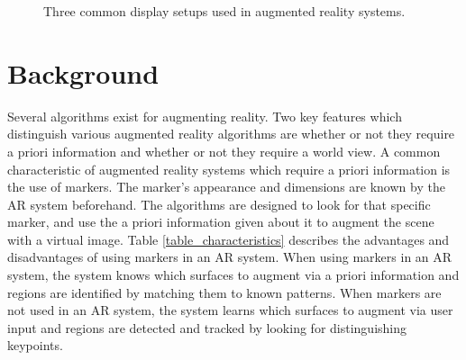 \documentclass[oneside,11pt]{Latex/Classes/PhDthesisPSnPDF}
\begin{document}
\begin{figure}[h!]
  \centering
  \quad{}\quad{}
  \caption{\label{fig_ar_displays} Three common display setups used in augmented reality systems.} 
\end{figure}

\chapter{Background}

Several algorithms exist for augmenting reality.  Two key features which distinguish various augmented reality algorithms are whether or not they require a priori information and whether or not they require a world view.  A common characteristic of augmented reality systems which require a priori information is the use of markers.  The marker's appearance and dimensions are known by the AR system beforehand.  The algorithms are designed to look for that specific marker, and use the a priori information given about it to augment the scene with a virtual image.  Table \ref{table_characteristics} describes the advantages and disadvantages of using markers in an AR system.  When using markers in an AR system, the system knows which surfaces to augment via a priori information and regions are identified by matching them to known patterns.  When markers are not used in an AR system, the system learns which surfaces to augment via user input and regions are detected and tracked by looking for distinguishing keypoints.
\end{document}
